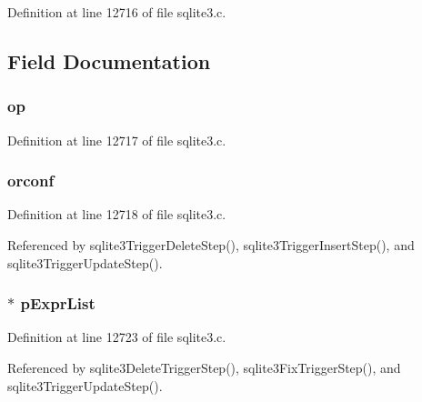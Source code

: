 Definition at line 12716 of file sqlite3.\+c.



\subsection{Field Documentation}
\hypertarget{struct_trigger_step_a0991b29aa40e12f033237266ebe6610c}{}
\subsubsection[{op}]{ op}\label{struct_trigger_step_a0991b29aa40e12f033237266ebe6610c}


Definition at line 12717 of file sqlite3.\+c.

\hypertarget{struct_trigger_step_acd8a3ffdaa6342753efa34131e0f414f}{}
\subsubsection[{orconf}]{ orconf}\label{struct_trigger_step_acd8a3ffdaa6342753efa34131e0f414f}


Definition at line 12718 of file sqlite3.\+c.



Referenced by sqlite3\+Trigger\+Delete\+Step(), sqlite3\+Trigger\+Insert\+Step(), and sqlite3\+Trigger\+Update\+Step().

\hypertarget{struct_trigger_step_a59f61440b4fb0aa52cc63f045cc0abfa}{}
\subsubsection[{p\+Expr\+List}]{$\ast$ p\+Expr\+List}\label{struct_trigger_step_a59f61440b4fb0aa52cc63f045cc0abfa}


Definition at line 12723 of file sqlite3.\+c.



Referenced by sqlite3\+Delete\+Trigger\+Step(), sqlite3\+Fix\+Trigger\+Step(), and sqlite3\+Trigger\+Update\+Step().

\hypertarget{struct_trigger_step_a2a5b925a55a70856d6818870b53bd74a}{}

